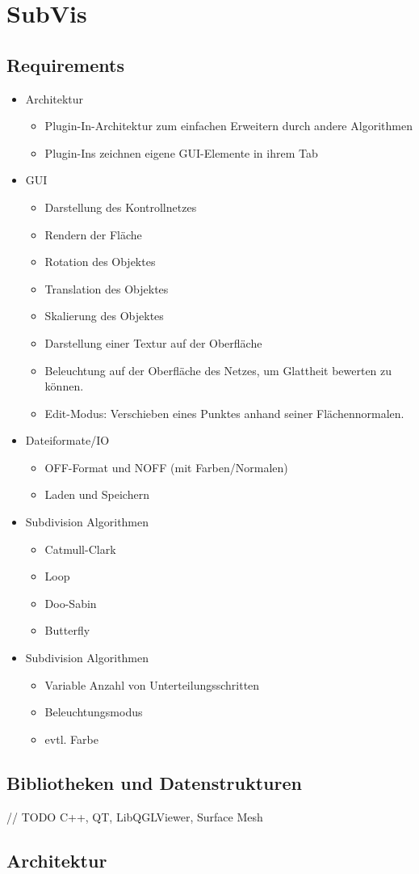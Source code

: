 \chapter{SubVis}


\section{Requirements}

\begin{itemize}
 \item Architektur
 \begin{itemize}
 	\item Plugin-In-Architektur zum einfachen Erweitern durch andere Algorithmen
 	\item Plugin-Ins zeichnen eigene GUI-Elemente in ihrem Tab
 \end{itemize}
 \item GUI
  \begin{itemize}
 	\item Darstellung des Kontrollnetzes
 	\item Rendern der Fläche
 	\item Rotation des Objektes 
 	\item Translation des Objektes
 	\item Skalierung des Objektes
 	\item Darstellung einer Textur auf der Oberfläche
 	\item Beleuchtung auf der Oberfläche des Netzes, um Glattheit bewerten zu können.
 	\item Edit-Modus: Verschieben eines Punktes anhand seiner Flächennormalen.
 \end{itemize}
 \item Dateiformate/IO
 \begin{itemize}
 	\item OFF-Format und NOFF (mit Farben/Normalen)
 	\item Laden und Speichern
 \end{itemize}
 \item Subdivision Algorithmen
 \begin{itemize}
 	\item Catmull-Clark
 	\item Loop
 	\item Doo-Sabin
 	\item Butterfly
 \end{itemize}
 \item Subdivision Algorithmen
 \begin{itemize}
  \item Variable Anzahl von Unterteilungsschritten
  \item Beleuchtungsmodus
  \item evtl. Farbe
 \end{itemize}
\end{itemize}

\section{Bibliotheken und Datenstrukturen}

// TODO C++, QT, LibQGLViewer, Surface Mesh

\section{Architektur}



